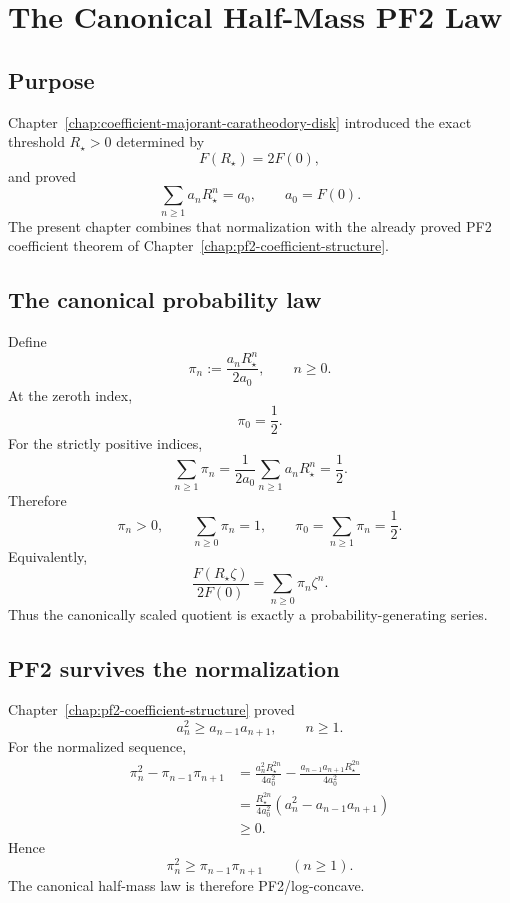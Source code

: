 \chapter{The Canonical Half-Mass PF2 Law}
\label{chap:canonical-half-mass-pf2-law}


\section{Purpose}

Chapter~\ref{chap:coefficient-majorant-caratheodory-disk} introduced the exact threshold \(R_\star>0\) determined by
\[
 F(R_\star)=2F(0),
\]
and proved
\[
 \sum_{n\ge1}a_nR_\star^n=a_0,
 \qquad a_0=F(0).
\]
The present chapter combines that normalization with the already proved PF2 coefficient theorem of Chapter~\ref{chap:pf2-coefficient-structure}.

\section{The canonical probability law}

Define
\[
 \pi_n:=\frac{a_nR_\star^n}{2a_0},
 \qquad n\ge0.
\]
At the zeroth index,
\[
 \boxed{\pi_0=\frac12.}
\]
For the strictly positive indices,
\[
 \sum_{n\ge1}\pi_n
 =\frac1{2a_0}\sum_{n\ge1}a_nR_\star^n
 =\frac12.
\]
Therefore
\[
 \boxed{
 \pi_n>0,
 \qquad
 \sum_{n\ge0}\pi_n=1,
 \qquad
 \pi_0=\sum_{n\ge1}\pi_n=\frac12.
 }
\]
Equivalently,
\[
 \boxed{
 \frac{F(R_\star\zeta)}{2F(0)}
 =\sum_{n\ge0}\pi_n\zeta^n.
 }
\]
Thus the canonically scaled quotient is exactly a probability-generating series.

\section{PF2 survives the normalization}

Chapter~\ref{chap:pf2-coefficient-structure} proved
\[
 a_n^2\ge a_{n-1}a_{n+1},
 \qquad n\ge1.
\]
For the normalized sequence,
\begin{align*}
 \pi_n^2-\pi_{n-1}\pi_{n+1}
 &=\frac{a_n^2R_\star^{2n}}{4a_0^2}
 -\frac{a_{n-1}a_{n+1}R_\star^{2n}}{4a_0^2}\\
 &=\frac{R_\star^{2n}}{4a_0^2}
 \left(a_n^2-a_{n-1}a_{n+1}\right)\\
 &\ge0.
\end{align*}
Hence
\[
 \boxed{\pi_n^2\ge\pi_{n-1}\pi_{n+1}\qquad(n\ge1).}
\]
The canonical half-mass law is therefore PF2/log-concave.

